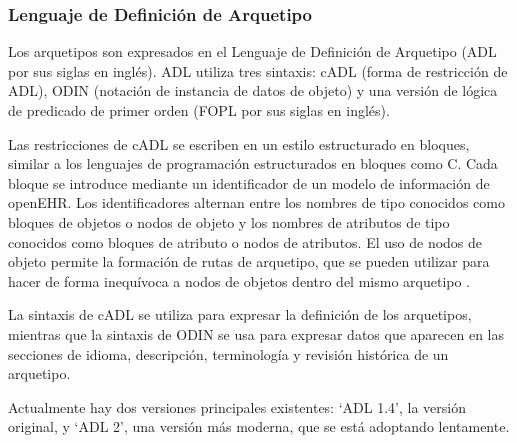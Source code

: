 \subsubsection{Lenguaje de Definición de Arquetipo}

Los arquetipos son expresados en el Lenguaje de Definición de Arquetipo \cite{openEHRADL} (ADL por sus siglas en inglés). ADL utiliza tres sintaxis: cADL (forma de restricción de ADL), ODIN (notación de instancia de datos de objeto) y una versión de lógica de predicado de primer orden (FOPL por sus siglas en inglés).

Las restricciones de cADL se escriben en un estilo estructurado en bloques, similar a los lenguajes de programación estructurados en bloques como C. Cada bloque se introduce mediante un identificador de un modelo de información de openEHR. Los identificadores alternan entre los nombres de tipo conocidos como bloques de objetos o nodos de objeto y los nombres de atributos de tipo conocidos como bloques de atributo o nodos de atributos. El uso de nodos de objeto permite la formación de rutas de arquetipo, que se pueden utilizar para hacer de forma inequívoca a nodos de objetos dentro del mismo arquetipo \cite{openEHRADL}.

La sintaxis de cADL se utiliza para expresar la definición de los arquetipos, mientras que la sintaxis de ODIN se usa para expresar datos que aparecen en las secciones de idioma, descripción, terminología y revisión histórica de un arquetipo.

Actualmente hay dos versiones principales existentes: `ADL 1.4', la versión original, y `ADL 2', una versión más moderna, que se está adoptando lentamente.
